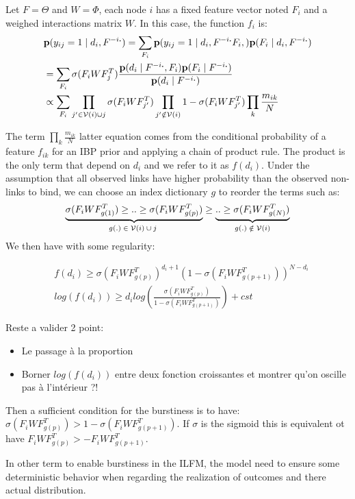 Let $F=\Theta$ and $W=\Phi$, each node $i$ has a fixed feature vector noted $F_i$ and a weighed interactions matrix $W$. In this case, the function $f_i$ is:
\begin{align}
&\mathbf{p}(y_{ij}=1 \mid d_i, F^{-i\bm{.}}) = \sum_{F_i} \mathbf{p}(y_{ij}=1 \mid d_i, F^{-i\bm{.}} F_i,) \mathbf{p}(F_i \mid d_i, F^{-i\bm{.}}) \\
&= \sum_{F_i} \sigma(F_iWF_j^T) \frac{\mathbf{p}(d_i \mid F^{-i\bm{.}}, F_i) \mathbf{p}(F_i\mid F^{-i\bm{.}}) }{\mathbf{p}(d_i\mid F^{-i\bm{.}})}\\
&\propto \sum_{F_i} \prod_{j' \in \mathcal{V}(i) \cup {j}} \sigma(F_iWF_{j'}^T)\prod_{j' \notin \mathcal{V}(i)} 1-\sigma(F_iWF_{j'}^T) \prod_k \frac{m_{ik}}{N}
\end{align}

The term $\prod_k \frac{m_{ik}}{N}$ latter equation comes from the conditional probability of a feature $f_{ik}$ for an IBP prior and applying a chain of product rule. The product is the only term that depend on $d_i$ and we refer to it as $f(d_i)$.
Under the assumption that all observed links have higher probability than the observed non-links to bind, we can choose an index dictionary $g$ to reorder the terms such as:
\begin{equation}
\underbrace{\sigma(F_iWF_{g(1)}^T) \geq .. \geq\sigma(F_iWF_{g(p)}^T) }_\textnormal{$g(.) \in \mathcal{V}(i) \cup {j}$ }\geq \underbrace{ .. \geq \sigma(F_iWF_{g(N)}^T)}_\textnormal{$g(.) \notin \mathcal{V}(i)$}
\end{equation}
We then have with some regularity:

\begin{align}
&f(d_i)\geq \sigma(F_iWF_{g(p)}^T)^{d_i +1} (1 - \sigma(F_iWF_{g(p+1)}^T))^{N - d_i} \\
&log(f(d_i)) \geq d_i log(\frac{\sigma(F_iWF_{g(p)}^T)}{1-  \sigma(F_iWF_{g(p+1)}^T)}) + cst
\end{align}


Reste a valider 2 point:
\begin{itemize}
	\item Le passage à la proportion
	\item Borner $log(f(d_i))$ entre deux fonction croissantes et montrer qu'on oscille pas à l'intérieur ?!
\end{itemize}

Then a sufficient condition for the burstiness is to have: $\sigma(F_iWF_{g(p)}^T) > 1- \sigma(F_iWF_{g(p+1)}^T)$. If $\sigma$ is the sigmoid this is equivalent ot have $F_iWF_{g(p)}^T > - F_iWF_{g(p+1)}^T$. 

In other term to enable burstiness in the ILFM, the model need to ensure some deterministic behavior when regarding the realization of outcomes and there actual distribution.


